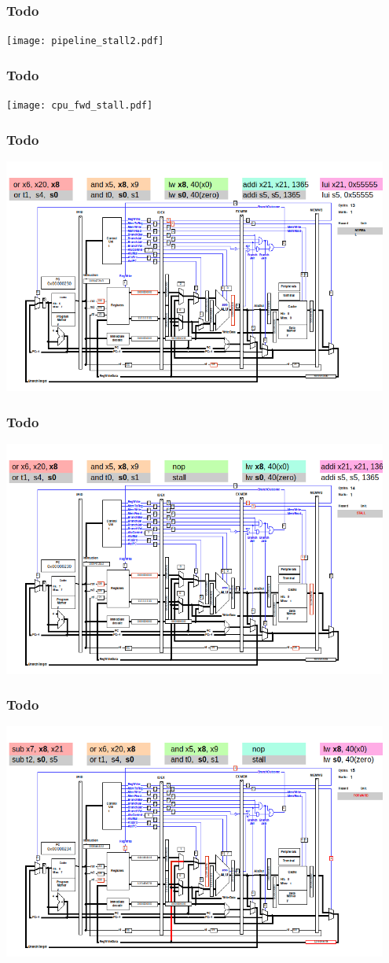 \documentclass{beamer}
\begin{document}
\begin{frame}
\frametitle{Todo}
\texttt{[image: pipeline\_stall2.pdf]}
\end{frame}

\begin{frame}
\frametitle{Todo}
\texttt{[image: cpu\_fwd\_stall.pdf]}
\end{frame}

\begin{frame}
\frametitle{Todo}
\includegraphics[width=0.95\textwidth]{fig/hazard-stall-qtrvsim2.png}
\end{frame}

\begin{frame}
\frametitle{Todo}
\includegraphics[width=0.95\textwidth]{fig/hazard-stall-qtrvsim3.png}
\end{frame}

\begin{frame}
\frametitle{Todo}
\includegraphics[width=0.95\textwidth]{fig/hazard-stall-qtrvsim4.png}
\end{frame}
\end{document}
